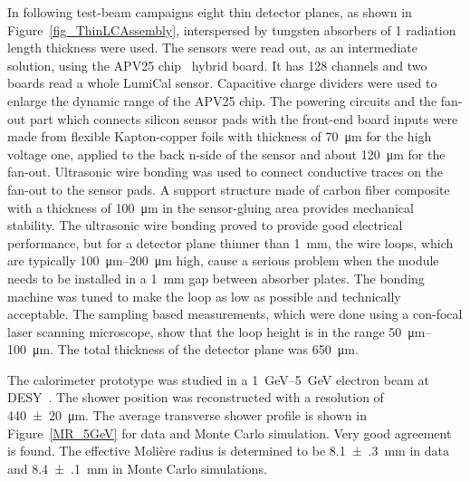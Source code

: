 In following test-beam campaigns eight thin detector planes, as shown in  Figure~\ref{fig_ThinLCAssembly}, 
interspersed by tungsten absorbers of 1 radiation length
thickness were used. The sensors were read out, as an intermediate solution, using 
the APV25 chip~\cite{949881,French2001359} hybrid board. It has 128 channels and two boards read a whole LumiCal sensor. 
Capacitive 
charge dividers were used to enlarge the dynamic range of the APV25 chip.  
The powering circuits and the fan-out part which connects silicon sensor pads with the front-end
board inputs were made from flexible Kapton-copper foils with thickness of \SI{70}{\micro\meter} for the high voltage one,
applied to the back n-side of the sensor and about \SI{120}{\micro\meter} for the fan-out.
Ultrasonic wire bonding was used to connect conductive traces on the fan-out to the sensor pads.
A support structure made of carbon fiber composite with a thickness of \SI{100}{\micro\meter} in the sensor-gluing area
provides mechanical stability. 
The ultrasonic wire bonding proved to provide good electrical performance, but for a detector plane thinner than \SI{1}{mm}, the wire loops,
which are typically \SIrange{100}{200}{\micro\meter} high, cause a serious problem when the module needs to be installed in a \SI{1}{mm} gap between absorber plates.
The bonding machine was tuned to make the loop as low as possible and technically acceptable.
The sampling based measurements, which were done using a con-focal laser scanning microscope, show that the loop
height is in the range \SIrange{50}{100}{\micro\meter}. The total thickness of the detector plane was \SI{650}{\micro\meter}.

The calorimeter prototype was studied in a \SIrange{1}{5}{GeV} electron beam at DESY~\cite{Ghenescu:2018sow,Abramowicz:2018vwb}. The shower position was reconstructed with a resolution of \SI{440(20)}{\micro\meter}.
The average transverse shower profile is shown in 
Figure~\ref{MR_5GeV} for data and Monte Carlo simulation. Very good agreement is found. The effective Moli\`ere radius is
determined to be \SI{8.1(3)}{mm} in data and \SI{8.4(1)}{mm} in Monte Carlo simulations.

